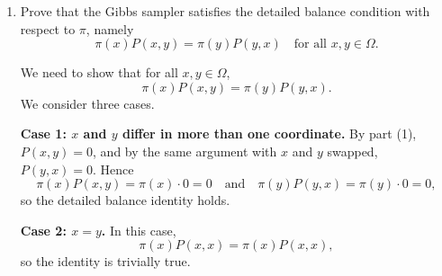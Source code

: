 \documentclass[answers,12pt,addpoints]{exam}
\begin{document}
\begin{enumerate}
    \begin{solution}
        Suppose $x,y \in \Omega$ differ in exactly one coordinate, say the $i$-th one, and
satisfy $x_{-i} = y_{-i}$. Then the only way to move from $x$ to $y$ in one step
of the random-scan Gibbs sampler is:
\begin{itemize}
    \item first choose $I_t = i$ in step 1, which happens with probability
    $\mathbb{P}(I_t = i) = 1/d$;
    \item then, in step 2, resample the $i$-th coordinate from the conditional
    distribution $\pi(\,\cdot \mid x_{-i})$ and obtain the value $y_i$.
\end{itemize}
If $I_t \neq i$, the $i$-th coordinate of $X_t$ is not updated, so we cannot have
$X_{t+1} = y$ because $x_i \neq y_i$. Thus,
\[
P(x,y)
= \mathbb{P}(X_{t+1} = y \mid X_t = x)
= \mathbb{P}(I_t = i)\,
  \mathbb{P}(X_{t+1} = y \mid X_t = x, I_t = i).
\]
Given $X_t = x$ and $I_t = i$, we update only the $i$-th coordinate using
$\pi(\,\cdot \mid x_{-i})$ and keep all other coordinates fixed at $x_{-i} =
y_{-i}$. Therefore,
\[
\mathbb{P}(X_{t+1} = y \mid X_t = x, I_t = i)
= \mathbb{P}(X_{t+1,i} = y_i \mid X_t = x, I_t = i)
= \pi(y_i \mid x_{-i}).
\]
Combining these two factors, we obtain
\[
P(x,y) = \frac{1}{d}\,\pi(y_i \mid x_{-i}),
\]
as claimed.
    \end{solution}
    \item Prove that the Gibbs sampler satisfies the detailed balance condition with respect to $\pi$, namely
    \[
    \pi(x) P(x,y) = \pi(y) P(y,x)
    \quad \text{for all } x,y \in \Omega.
    \]
    \begin{solution}
        We need to show that for all $x,y \in \Omega$,
\[
\pi(x) P(x,y) = \pi(y) P(y,x).
\]
We consider three cases.

\medskip
\noindent\textbf{Case 1: $x$ and $y$ differ in more than one coordinate.}
By part (1), $P(x,y) = 0$, and by the same argument with $x$ and $y$ swapped,
$P(y,x) = 0$. Hence
\[
\pi(x) P(x,y) = \pi(x)\cdot 0 = 0
\quad\text{and}\quad
\pi(y) P(y,x) = \pi(y)\cdot 0 = 0,
\]
so the detailed balance identity holds.

\medskip
\noindent\textbf{Case 2: $x = y$.}
In this case,
\[
\pi(x) P(x,x) = \pi(x) P(x,x),
\]
so the identity is trivially true.


\end{solution}
\end{enumerate}
\end{document}

